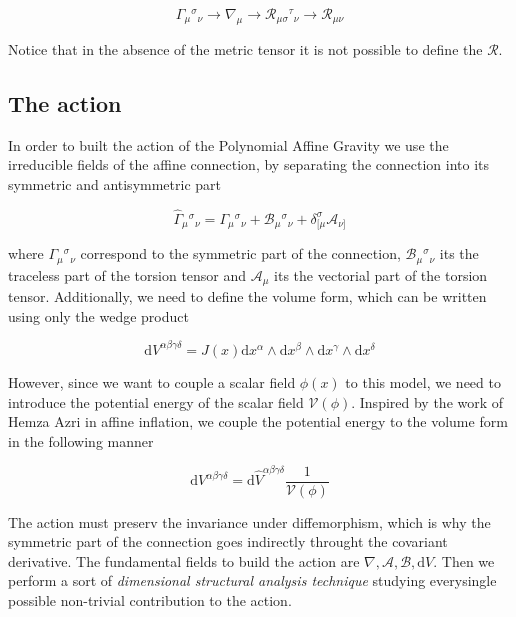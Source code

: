 \documentclass[10pt,a4paper]{article}
\begin{document}
\begin{equation}
  \Gamma_{\mu}{}^{\sigma}{}_{\nu} \to
  \nabla_\mu \to \mathcal{R}_{\mu\sigma}{}^{\tau}{}_{\nu} \to \mathcal{R}_{\mu\nu}  
\end{equation} 

Notice that in the absence of the metric tensor it is not possible to define the $\mathcal{R}$.

\subsection{The action}

In order to built the action of the Polynomial Affine Gravity we use the irreducible fields of the affine connection,
by separating the connection into its symmetric and antisymmetric part

\begin{equation}
  \hat{\Gamma}_{\mu}{}^{\sigma}{}_{\nu} = \Gamma_{\mu}{}^{\sigma}{}_{\nu} + \mathcal{B}_{\mu}{}^{\sigma}{}_{\nu} + \delta^{\sigma}_{[\mu}\mathcal{A}_{\nu]}
\end{equation}

where $\Gamma_{\mu}{}^{\sigma}{}_{\nu}$ correspond to the symmetric part of the connection, $\mathcal{B}_{\mu}{}^{\sigma}{}_{\nu}$ its the traceless
part of the torsion tensor and $\mathcal{A}_{\mu}$ its the vectorial part of the torsion tensor. Additionally, we need to define the volume
form, which can be written using only the wedge product

\begin{equation}
  \mathrm{d}V^{\alpha\beta\gamma\delta} = J(x)\mathrm{d}x^{\alpha}\wedge\mathrm{d}x^{\beta}\wedge\mathrm{d}x^{\gamma}\wedge\mathrm{d}x^{\delta}
\end{equation}

However, since we want to couple a scalar field $\phi (x)$ to this model, we need to introduce the potential energy of the 
scalar field $\mathcal{V}(\phi)$. Inspired by the work of Hemza Azri in affine inflation, we couple the potential energy to
the volume form in the following manner

\begin{equation}
  \mathrm{d}V^{\alpha\beta\gamma\delta} = \mathrm{d}\hat{V}^{\alpha\beta\gamma\delta}\frac{1}{\mathcal{V}(\phi)}
\end{equation}

The action must preserv the invariance under diffemorphism, which is why the symmetric part of the connection goes indirectly throught the 
covariant derivative. The fundamental fields to build the action are $\nabla, \mathcal{A}, \mathcal{B}, \mathrm{d}V$. Then we perform a sort
of \textit{dimensional structural analysis technique} studying everysingle possible non-trivial contribution to the action.
\end{document}

